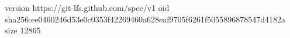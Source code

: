 version https://git-lfs.github.com/spec/v1
oid sha256:ee0460246d53e0c0353f42269460a628eaf9705f6261f5055896878547d4182a
size 12865
